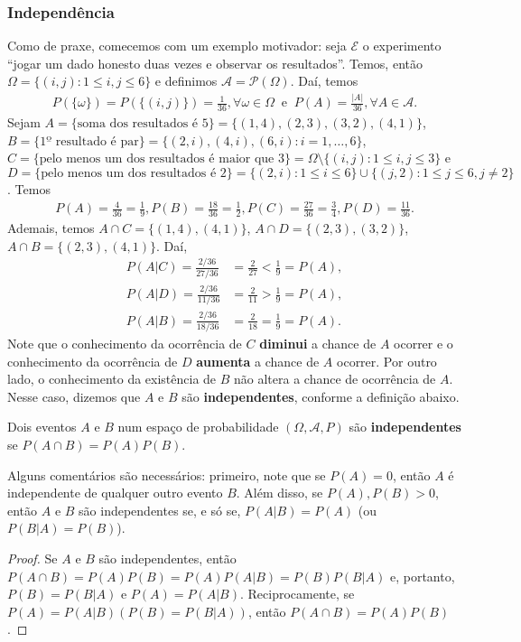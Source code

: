 \documentclass[../Notas.tex]{subfiles}
\begin{document}
\subsubsection{Independência}
Como de praxe, comecemos com um exemplo motivador: seja $\mathcal{E}$ o experimento ``jogar um dado honesto duas vezes e observar os resultados''. Temos, então $\Omega = \{ (i,j) : 1\leq i,j \leq 6 \}$ e definimos $\mathcal{A} = \mathcal{P}(\Omega)$. Daí, temos
\begin{align*}
    P(\{\omega\}) = P(\{(i,j)\}) = \frac{1}{36}, \forall\omega\in\Omega \ \text{ e } \ P(A) = \frac{|A|}{36}, \forall A\in\mathcal{A}. 
\end{align*}
Sejam $A = \{ \text{soma dos resultados é 5} \} = \{ (1,4), (2,3), (3,2), (4,1) \}$, $B = \{ \text{1º resultado é par} \} = \{(2,i), (4,i), (6,i) : i = 1, \dots, 6\}$, $C = \{\text{pelo menos um dos resultados é maior que 3}\} = \Omega\setminus\{(i,j) : 1\leq i,j\leq 3 \}$ e $D = \{ \text{pelo menos um dos resultados é 2} \} = \{ (2,i) : 1\leq i\leq 6 \}\cup \{ (j,2) : 1\leq j\leq 6, j\neq 2 \}$. Temos
\begin{align*}
    P(A) = \frac{4}{36} = \frac{1}{9}, P(B) = \frac{18}{36} = \frac{1}{2}, P(C) = \frac{27}{36} = \frac{3}{4}, P(D) = \frac{11}{36}.
\end{align*}
Ademais, temos $A\cap C = \{ (1,4), (4,1) \}$, $A\cap D = \{ (2,3), (3,2) \}$, $A\cap B = \{ (2,3), (4,1) \}$. Daí,
\begin{align*}
    P(A|C) = \frac{2/36}{27/36} &= \frac{2}{27} < \frac{1}{9} = P(A), \\
    P(A|D) = \frac{2/36}{11/36} &= \frac{2}{11} > \frac{1}{9} = P(A), \\
    P(A|B) = \frac{2/36}{18/36} &= \frac{2}{18} = \frac{1}{9} = P(A).
\end{align*}
Note que o conhecimento da ocorrência de $C$ \textbf{diminui} a chance de $A$ ocorrer e o conhecimento da ocorrência de $D$ \textbf{aumenta} a chance de $A$ ocorrer. Por outro lado, o conhecimento da existência de $B$ não altera a chance de ocorrência de $A$. Nesse caso, dizemos que $A$ e $B$ são \textbf{independentes}, conforme a definição abaixo.
\begin{definition}[Independência]
Dois eventos $A$ e $B$ num espaço de probabilidade $(\Omega, \mathcal{A}, P)$ são \textbf{independentes} se $P(A\cap B) = P(A)P(B)$.
\end{definition}
Alguns comentários são necessários: primeiro, note que se $P(A) = 0$, então $A$ é independente de qualquer outro evento $B$. Além disso, se $P(A), P(B) > 0$, então $A$ e $B$ são independentes se, e só se, $P(A|B) = P(A)$ (ou $P(B|A) = P(B)$).
\begin{proof}
Se $A$ e $B$ são independentes, então $P(A\cap B) = P(A)P(B) = P(A)P(A|B) = P(B)P(B|A)$ e, portanto, $P(B) = P(B|A)$ e $P(A) = P(A|B)$. Reciprocamente, se $P(A) = P(A|B) (P(B) = P(B|A))$, então $P(A\cap B) = P(A)P(B)$.
\end{proof}
\end{document}
